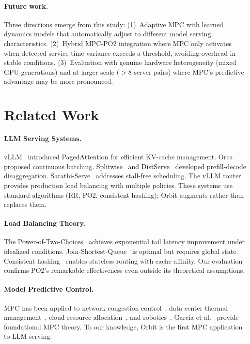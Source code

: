 \documentclass[runningheads]{llncs}
\begin{document}
\paragraph{Future work.} Three directions emerge from this study: (1)~Adaptive MPC with learned dynamics models that automatically adjust to different model serving characteristics. (2)~Hybrid MPC-PO2 integration where MPC only activates when detected service time variance exceeds a threshold, avoiding overhead in stable conditions. (3)~Evaluation with genuine hardware heterogeneity (mixed GPU generations) and at larger scale ($>$8 server pairs) where MPC's predictive advantage may be more pronounced.

\section{Related Work}
\label{sec:related}

\paragraph{LLM Serving Systems.} vLLM~\cite{kwon2023vllm} introduced PagedAttention for efficient KV-cache management. Orca~\cite{yu2022orca} proposed continuous batching. Splitwise~\cite{patel2024splitwise} and DistServe~\cite{zhong2024distserve} developed prefill-decode disaggregation. Sarathi-Serve~\cite{agrawal2024taming} addresses stall-free scheduling. The vLLM router~\cite{vllmrouter2025} provides production load balancing with multiple policies. These systems use standard algorithms (RR, PO2, consistent hashing); Orbit augments rather than replaces them.

\paragraph{Load Balancing Theory.} The Power-of-Two-Choices~\cite{mitzenmacher2001power} achieves exponential tail latency improvement under idealized conditions. Join-Shortest-Queue~\cite{eschenfeldt2018jsq} is optimal but requires global state. Consistent hashing~\cite{karger1997consistent} enables stateless routing with cache affinity. Our evaluation confirms PO2's remarkable effectiveness even outside its theoretical assumptions.

\paragraph{Model Predictive Control.} MPC has been applied to network congestion control~\cite{low2002internet}, data center thermal management~\cite{lazic2018datacenter}, cloud resource allocation~\cite{zhang2021mpc}, and robotics~\cite{williams2017mppi}. Garcia et al.~\cite{garcia1989mpc} provide foundational MPC theory. To our knowledge, Orbit is the first MPC application to LLM serving.
\end{document}

